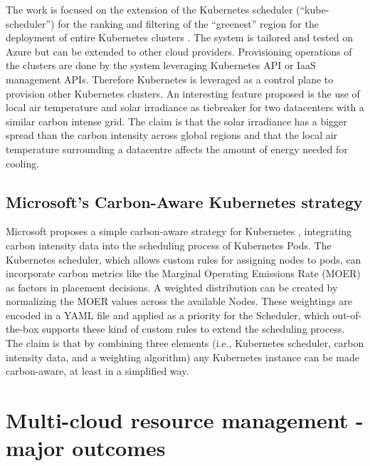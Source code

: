The work is focused on the extension of the Kubernetes scheduler (``kube-scheduler'') for the ranking and filtering of the ``greenest'' region for the deployment of entire Kubernetes clusters \cite{low_carbon_k8s_scheduler}.
The system is tailored and tested on Azure but can be extended to other cloud providers.
Provisioning  operations of the clusters are done by the system leveraging Kubernetes API or IaaS management APIs.
Therefore Kubernetes is leveraged as a control plane to provision other Kubernetes clusters.
An interesting feature proposed is the use of local air temperature and solar irradiance as tiebreaker for two datacenters with a similar carbon intense grid. 
The claim is that the solar irradiance has a bigger spread than the carbon intensity across global regions and that the local air temperature surrounding a datacentre affects the amount of energy needed for cooling. 

\subsection{Microsoft's Carbon-Aware Kubernetes strategy}
\label{sec:microsoft_carbon_aware_k8s}

Microsoft proposes a simple carbon-aware strategy for Kubernetes \cite{microsoft_carbon_aware_k8s}, integrating carbon intensity data into the scheduling process of Kubernetes Pods.
The Kubernetes scheduler, which allows custom rules for assigning nodes to pods, can incorporate carbon metrics like the Marginal Operating Emissions Rate (MOER) as factors in placement decisions. 
A weighted distribution can be created by normalizing the MOER values across the available Nodes.
These weightings are encoded in a YAML file and applied as a priority for the Scheduler, which out-of-the-box supports these kind of custom rules to extend the scheduling process.
The claim is that by combining three elements (i.e., Kubernetes scheduler, carbon intensity data, and a weighting algorithm) any Kubernetes instance can be made carbon-aware, at least in a simplified way.

\newpage

\section{Multi-cloud resource management - major outcomes}
\label{sec:multi_cloud_resource_management_outcomes}

